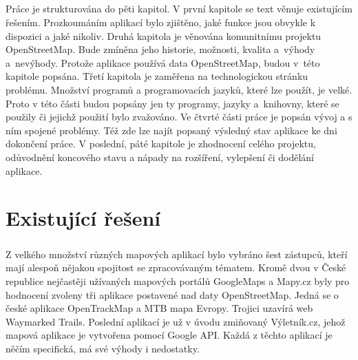 \documentclass[11pt,a4paper,titlepage,oneside]{book}
\begin{document}




	\paragraph{} Práce je strukturována do pěti kapitol. V první kapitole se text věnuje existujícím řešením. Prozkoumáním aplikací bylo zjištěno, jaké funkce jsou obvykle k dispozici a jaké nikoliv. Druhá kapitola je věnována  komunitnímu projektu OpenStreetMap. Bude zmíněna jeho historie, možnosti, kvalita a~výhody a~nevýhody. Protože aplikace používá data OpenStreetMap, budou v~této kapitole popsána. Třetí kapitola je zaměřena na technologickou stránku problému. Množství programů a programovacích jazyků, které lze použít, je velké. Proto v této části budou popsány jen ty programy, jazyky a~knihovny, které se použily či  jejichž použití bylo zvažováno. Ve čtvrté části práce je popsán vývoj a s ním spojené problémy. Též zde lze najít popsaný výsledný stav aplikace ke dni dokončení práce. V poslední, páté kapitole je zhodnocení celého projektu, odůvodnění koncového stavu a nápady na rozšíření, vylepšení či dodělání aplikace.
	
\pagestyle{fancy}

\chapter{Existující řešení}
	\label{sec:Ex_reseni}
	\paragraph{} Z velkého množství různých mapových aplikací bylo vybráno šest zástupců, kteří mají alespoň nějakou spojitost se zpracovávaným tématem. Kromě dvou v České republice nejčastěji užívaných mapových portálů GoogleMaps a Mapy.cz byly pro hodnocení zvoleny tři aplikace postavené nad daty OpenStreetMap. Jedná se o české aplikace OpenTrackMap a MTB mapa Evropy. Trojici uzavírá web Waymarked Trails. Poslední aplikací je už v úvodu zmiňovaný Výletník.cz, jehož mapová aplikace je vytvořena pomocí Google API. Každá z těchto aplikací je něčím specifická, má své výhody i nedostatky. 
\end{document}
